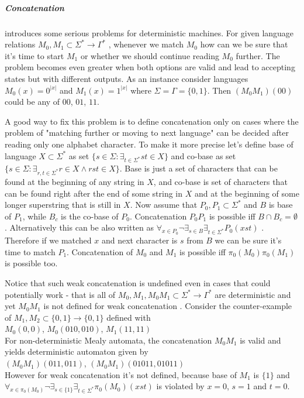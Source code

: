 \documentclass[12pt]{article}
\begin{document}
\subparagraph{Concatenation}  introduces some serious problems for deterministic machines. For given language relations $M_0,M_1 \subset \Sigma^* \rightarrow \Gamma^* $ , whenever we match $M_0$ how can we be sure that it's time to start $M_1$ or whether we should continue reading $M_0$ further. The problem becomes even greater when both options are valid and lead to accepting states but with different outputs. As an instance consider languages $M_0(x) =  0^{\vert x \vert} $ and $M_1(x) =  1^{\vert x \vert} $ where $\Sigma=\Gamma=\{0,1\}$. Then $(M_0M_1)(00)$ could be any of $00$, $01$, $11$. 


A good way to fix this problem is to define concatenation only on cases where the problem of "matching further or moving to next language" can be decided after reading only one alphabet character. To make it more precise let's define base of language $X \subset \Sigma^*$ as set $\{s\in\Sigma : \exists_{t\in\Sigma^*}st\in X\}$ and co-base as set  $\{s\in\Sigma : \exists_{r,t\in\Sigma^*}r\in X \wedge rst\in X\}$. Base is just a set of characters that can be found at the beginning of any string in $X$, and co-base is set of characters that can be found right after the end of some string in $X$ and at the beginning of some longer superstring that is still in $X$. Now assume that $P_0,P_1 \subset \Sigma^*$ and $B$ is base of $P_1$, while $B_c$ is the co-base of $P_0$. Concatenation $P_0P_1$ is possible iff $B\cap B_c = \emptyset$. Alternatively this can be also written as $\forall_{x\in P_0} \neg \exists_{s\in B} \exists_{t\in\Sigma^*} P_0(xst)$ . Therefore if we matched $x$ and next character is $s$ from $B$ we can be sure it's time to match $P_1$. Concatenation of $M_0$ and $M_1$ is possible iff $\pi_0(M_0)\pi_0(M_1)$ is possible too. 

Notice that such weak concatenation is undefined even in cases that could potentially work - that is all of $M_0,M_1,M_0M_1 \subset \Sigma^* \rightarrow \Gamma^*$ are deterministic and yet $M_0M_1$ is not defined for weak concatenation . Consider the counter-example of $M_1,M_2 \subset \{0,1\}\rightarrow\{0,1\}$ defined with \\
$M_0(0,0)$,  $M_0(010,010)$, $M_1(11,11)$ \\
For non-deterministic Mealy automata, the concatenation $M_0M_1$ is valid and yields deterministic automaton given by \\
$(M_0M_1)(011,011)$,  $(M_0M_1)(01011,01011)$ \\
However for weak concatenation it's not defined, because base of $M_1$ is $\{1\}$ and  $\forall_{x\in \pi_0(M_0)} \neg \exists_{s\in\{1\}} \exists_{t\in\Sigma^*} \pi_0(M_0)(xst)$ is violated by $x=0$, $s=1$ and $t=0$.
\end{document}
